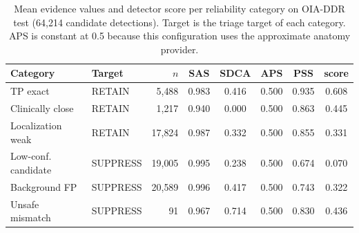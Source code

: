 \begin{table}[htbp]
\centering
\caption{Mean evidence values and detector score per reliability category on OIA-DDR test (64{,}214 candidate detections). Target is the triage target of each category. APS is constant at 0.5 because this configuration uses the approximate anatomy provider.}
\label{tab:category_breakdown}
\small
\setlength{\tabcolsep}{4.5pt}
\begin{tabular}{@{}llrccccc@{}}
\toprule
\textbf{Category} & \textbf{Target} & \textbf{$n$} & \textbf{SAS} & \textbf{SDCA} & \textbf{APS} & \textbf{PSS} & \textbf{score} \\
\midrule
TP exact & RETAIN & 5{,}488 & 0.983 & 0.416 & 0.500 & 0.935 & 0.608 \\
Clinically close & RETAIN & 1{,}217 & 0.940 & 0.000 & 0.500 & 0.863 & 0.445 \\
Localization weak & RETAIN & 17{,}824 & 0.987 & 0.332 & 0.500 & 0.855 & 0.331 \\
\midrule
Low-conf. candidate & SUPPRESS & 19{,}005 & 0.995 & 0.238 & 0.500 & 0.674 & 0.070 \\
Background FP & SUPPRESS & 20{,}589 & 0.996 & 0.417 & 0.500 & 0.743 & 0.322 \\
Unsafe mismatch & SUPPRESS & 91 & 0.967 & 0.714 & 0.500 & 0.830 & 0.436 \\
\bottomrule
\end{tabular}
\end{table}
